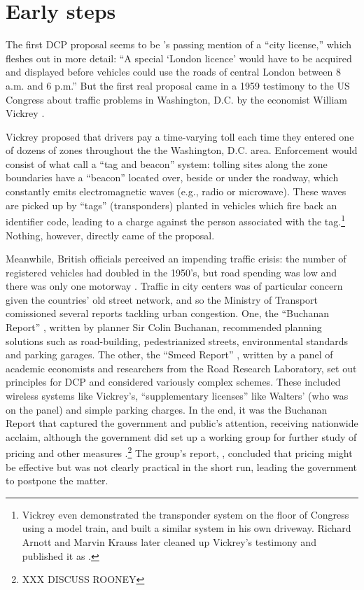 \section{Early steps}

The first DCP proposal seems to be \citet{buchanan1952}'s passing mention of a ``city license,'' which \citet{Walters1954} fleshes out in more detail: ``A special `London licence' would have to be acquired and displayed before vehicles could use the roads of central London between 8 a.m. and 6 p.m.'' But the first real proposal came in a 1959 testimony to the US Congress about traffic problems in Washington, D.C. by the economist William Vickrey \citep{Vickrey1959}. 

Vickrey proposed that drivers pay a time-varying toll each time they entered one of dozens of zones throughout the the Washington, D.C. area. Enforcement would consist of what \citet{DePalma2011} call a ``tag and beacon'' system: tolling sites along the zone boundaries have a ``beacon'' located over, beside or under the roadway, which constantly emits electromagnetic waves (e.g., radio or microwave). These waves are picked up by ``tags'' (transponders) planted in vehicles which fire back an identifier code, leading to a charge against the person associated with the tag.\footnote{Vickrey even demonstrated the transponder system on the floor of Congress using a model train, and built a similar system in his own driveway. Richard Arnott and Marvin Krauss later cleaned up Vickrey's testimony and published it as \citet{Vickrey1994}.} Nothing, however, directly came of the proposal.

Meanwhile, British officials perceived an impending traffic crisis: the number of registered vehicles had doubled in the 1950's, but road spending was low and there was only one motorway \citep{Gunn2011,Hall2004}. Traffic in city centers was of particular concern given the countries' old street network, and so the Ministry of Transport comissioned several reports tackling urban congestion. One, the ``Buchanan Report'' \citep{MoT1963}, written by planner Sir Colin Buchanan, recommended planning solutions such as road-building, pedestrianized streets, environmental standards and parking garages. The other, the ``Smeed Report'' \citep{MoT1964}, written by a panel of academic economists and researchers from the Road Research Laboratory, set out principles for DCP and considered variously complex schemes. These included wireless systems like Vickrey's, ``supplementary licenses'' like Walters' (who was on the panel) and simple parking charges. In the end, it was the Buchanan Report that captured the government and public's attention, receiving nationwide acclaim, although the government did set up a working group for further study of pricing and other measures \citep{Rooney2014}.\footnote{XXX DISCUSS ROONEY} The group's report, \citet{MoT1967}, concluded that pricing might be effective but was not clearly practical in the short run, leading the government to postpone the matter. 

